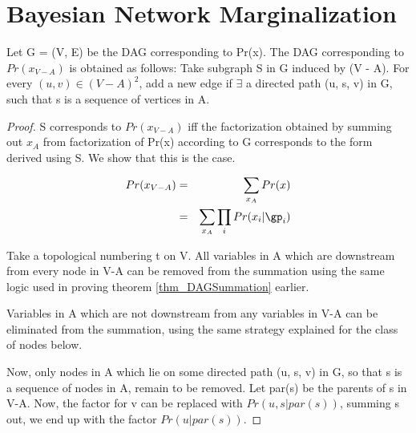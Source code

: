 \documentclass{article}
\begin{document}
\section{Bayesian Network Marginalization}
\begin{thm}
Let G = (V, E) be the DAG corresponding to Pr(x). The DAG corresponding to $Pr(x_{V-A})$ is obtained as follows: Take subgraph S in G induced by (V - A). For every $(u, v) \in (V-A)^{2}$, add a new edge if $\exists$ a directed path (u, s, v) in G, such that s is a sequence of vertices in A.
\end{thm}
\begin{proof}
S corresponds to $Pr(x_{V-A})$ iff the factorization obtained by summing out $x_A$ from factorization of Pr(x) according to G corresponds to the form derived using S. We show that this is the case.

\begin{eqnarray*}
Pr(x_{V-A}) &=& \sum_{x_A} Pr(x)\\
&=& \sum_{x_A} \prod_{i} Pr(x_i|\gp_i)\\
\end{eqnarray*}

Take a topological numbering t on V. All variables in A which are downstream from every node in V-A can be removed from the summation using the same logic used in proving theorem \ref{thm_DAGSummation} earlier.

Variables in A which are not downstream from any variables in V-A can be eliminated from the summation, using the same strategy explained for the class of nodes below.

Now, only nodes in A which lie on some directed path (u, s, v) in G, so that s is a sequence of nodes in A, remain to be removed. Let par(s) be the parents of s in V-A. Now, the factor for v can be replaced with $Pr(u, s|par(s))$, summing s out, we end up with the factor $Pr(u|par(s))$.
\end{proof}

% 
% 
\end{document}
